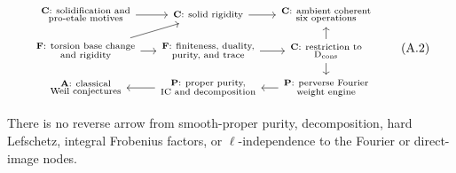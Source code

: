 \[
\begin{tikzcd}[column sep=small,row sep=small]
\substack{\mathbf C:\ \text{solidification and}\\
                 \text{pro-etale motives}}
 \arrow[r] &
\substack{\mathbf C:\ \text{solid rigidity}}
 \arrow[r] &
\substack{\mathbf C:\ \text{ambient coherent}\\
                 \text{six operations}} \\
\substack{\mathbf F:\ \text{torsion base change}\\
                 \text{and rigidity}}
 \arrow[ur] \arrow[r] &
\substack{\mathbf F:\ \text{finiteness, duality,}\\
                 \text{purity, and trace}}
 \arrow[r] &
\substack{\mathbf C:\ \text{restriction to}\\
                 \Dcons}
 \arrow[u] \arrow[d] \\
\substack{\mathbf A:\ \text{classical}\\
                 \text{Weil conjectures}}
 &
\substack{\mathbf P:\ \text{proper purity,}\\
                 \text{IC and decomposition}}
 \arrow[l] &
\substack{\mathbf P:\ \text{perverse Fourier}\\
                 \text{weight engine}}
 \arrow[l]
\end{tikzcd}
\tag{A.2}\label{eq:dossier-terminal-dependencies}
\]

There is no reverse arrow from smooth-proper purity, decomposition, hard
Lefschetz, integral Frobenius factors, or \(\ell\)-independence to the
Fourier or direct-image nodes.
